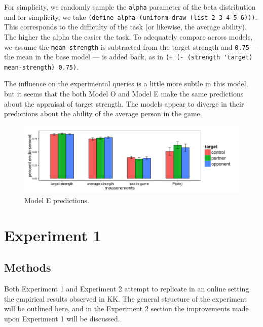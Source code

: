 \documentclass{article}
\begin{document}
For simplicity, we randomly sample the \lstinline{alpha} parameter of the beta distribution and for simplicity, we take
\lstinline{(define alpha (uniform-draw (list 2 3 4 5 6)))}. This corresponds to the difficulty of the task (or likewise, the average ability). The higher the alpha the easier the task. To adequately compare across models, we assume the \lstinline{mean-strength} is subtracted from the target strength and \lstinline{0.75} --- the mean in the base model --- is added back, as in \lstinline{(+ (- (strength 'target) mean-strength) 0.75)}.

The influence on the experimental queries is a little more subtle in this model, but it seems that the both Model O and Model E make the same predictions about the appraisal of target strength. The models appear to diverge in their predictions about the ability of the average person in the game.

\begin{figure}
\centering
    \includegraphics[width=\columnwidth]{modelE-predictions}
    \caption{Model E predictions.}
      \label{fig:modele}
\end{figure}


\section{Experiment 1}

\subsection{Methods}

Both Experiment 1 and Experiment 2 attempt to replicate in an online setting the empirical results observed in KK. The general structure of the experiment will be outlined here, and in the Experiment 2 section the improvements made upon Experiment 1 will be discussed.
\end{document}
